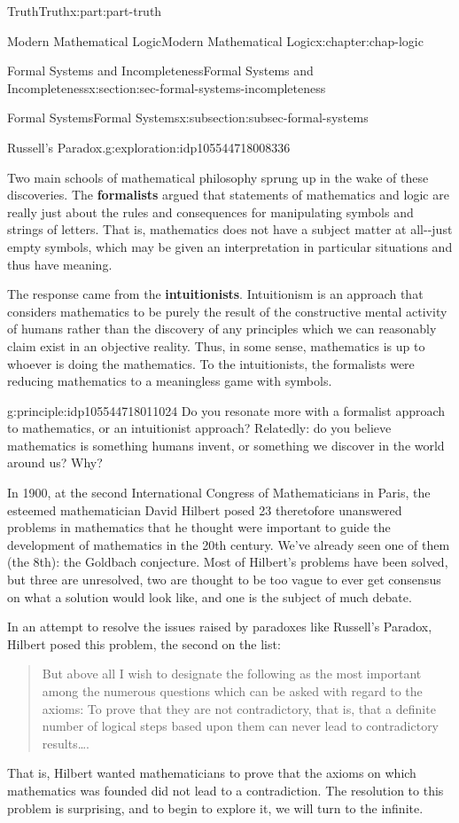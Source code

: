 \documentclass[oneside,10pt,]{book}
\newcommand{\terminology}[1]{\textbf{#1}}
\numberwithin{equation}{section}
\begin{document}
\begin{partptx}{Truth}{}{Truth}{}{}{x:part:part-truth}
\begin{chapterptx}{Modern Mathematical Logic}{}{Modern Mathematical Logic}{}{}{x:chapter:chap-logic}
\begin{sectionptx}{Formal Systems and Incompleteness}{}{Formal Systems and Incompleteness}{}{}{x:section:sec-formal-systems-incompleteness}
\begin{subsectionptx}{Formal Systems}{}{Formal Systems}{}{}{x:subsection:subsec-formal-systems}
\begin{exploration}{Russell's Paradox.}{g:exploration:idp105544718008336}
\end{exploration}%
Two main schools of mathematical philosophy sprung up in the wake of these discoveries. The \terminology{formalists} argued that statements of mathematics and logic are really just about the rules and consequences for manipulating symbols and strings of letters. That is, mathematics does not have a subject matter at all-{}-{}just empty symbols, which may be given an interpretation in particular situations and thus have meaning.%
\par
The response came from the \terminology{intuitionists}. Intuitionism is an approach that considers mathematics to be purely the result of the constructive mental activity of humans rather than the discovery of any principles which we can reasonably claim exist in an objective reality. Thus, in some sense, mathematics is up to whoever is doing the mathematics. To the intuitionists, the formalists were reducing mathematics to a meaningless game with symbols.%
\begin{principle}{}{}{g:principle:idp105544718011024}%
Do you resonate more with a formalist approach to mathematics, or an intuitionist approach? Relatedly: do you believe mathematics is something humans invent, or something we discover in the world around us? Why?%
\end{principle}
In 1900, at the second International Congress of Mathematicians in Paris, the esteemed mathematician David Hilbert posed 23 theretofore unanswered problems in mathematics that he thought were important to guide the development of mathematics in the 20th century. We've already seen one of them (the 8th): the Goldbach conjecture. Most of Hilbert's problems have been solved, but three are unresolved, two are thought to be too vague to ever get consensus on what a solution would look like, and one is the subject of much debate.%
\par
In an attempt to resolve the issues raised by paradoxes like Russell's Paradox, Hilbert posed this problem, the second on the list:%
\begin{quote}%
But above all I wish to designate the following as the most important among the numerous questions which can be asked with regard to the axioms: To prove that they are not contradictory, that is, that a definite number of logical steps based upon them can never lead to contradictory results….\end{quote}
That is, Hilbert wanted mathematicians to prove that the axioms on which mathematics was founded did not lead to a contradiction. The resolution to this problem is surprising, and to begin to explore it, we will turn to the infinite.%

\end{subsectionptx}
\end{sectionptx}
\end{chapterptx}
\end{partptx}
\end{document}
